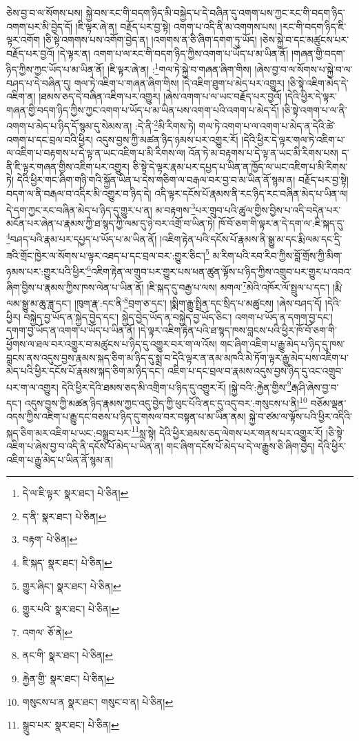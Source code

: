 ཅེས་བྱ་བ་ལ་སོགས་པས། སྐྱེ་བས་རང་གི་བདག་ཉིད་མི་བསྐྱེད་པ་དེ་བཞིན་དུ་འགག་པས་ཀྱང་རང་གི་བདག་ཉིད་འགག་པར་མི་བྱེད་དོ། །ཇི་ལྟར་ཞེ་ན། བརྗོད་པར་བྱ་སྟེ། འགག་པ་འདི་ནི་མ་འགགས་པས། །རང་གི་བདག་ཉིད་ཇི་ལྟར་འགོག །ཅི་སྟེ་འགགས་པས་འགོག་བྱེད་ན། །འགགས་ན་ཅི་ཞིག་དགག་ཏུ་ཡོད། །ཅེས་སྐྱེ་བ་དང་མཚུངས་པར་བརྗོད་པར་བྱའོ། །དེ་ལྟར་ན། འགག་པ་ལ་རང་གི་བདག་ཉིད་ཀྱིས་འགག་པ་ཡོད་པ་མ་ཡིན་ནོ། །གཞན་གྱི་བདག་ཉིད་ཀྱིས་ཀྱང་ཡོད་པ་མ་ཡིན་ནོ། །ཇི་ལྟར་ཞེ་ན། :\footnote{དེ་ལ་ཇི་ལྟར་  སྣར་ཐང་།  པེ་ཅིན། }གལ་ཏེ་སྐྱེ་བ་གཞན་ཞིག་གིས། །ཞེས་བྱ་བ་ལ་སོགས་པ་སྐྱེ་བ་ལ་བཤད་པ་དེ་བཞིན་དུ། གལ་ཏེ་འཇིག་པ་གཞན་ཞིག་གིས། །དེ་འཇིག་ཐུག་པ་མེད་པར་འགྱུར། །ཅི་སྟེ་འཇིག་མེད་དེ་འཇིག་ན། །ཐམས་ཅད་དེ་བཞིན་འཇིག་པར་འགྱུར། །ཞེས་འགག་པ་ལ་ཡང་བརྗོད་པར་བྱའོ། །དེའི་ཕྱིར་དེ་ལྟར་གཞན་གྱི་བདག་ཉིད་ཀྱིས་ཀྱང་འགག་པ་ཡོད་པ་མ་ཡིན་པས་འགག་པའི་འགག་པ་མེད་དོ། །ཅི་སྟེ་འགག་པ་ལ་ནི་འགག་པ་མེད་པ་ཉིད་དོ་སྙམ་དུ་སེམས་ན། :དེ་ནི་\footnote{ད་ནི་  སྣར་ཐང་།  པེ་ཅིན། }མི་རིགས་ཏེ། གལ་ཏེ་འགག་པ་ལ་འགག་པ་མེད་ན་དེའི་ཚེ་འགག་པ་དང་བྲལ་བའི་ཕྱིར། འདུས་བྱས་ཀྱི་མཚན་ཉིད་ཉམས་པར་འགྱུར་རོ། །དེའི་ཕྱིར་དེ་ལྟར་གལ་ཏེ་འཇིག་པ་ལ་འཇིག་པ་བརྟགས་པ་དེ་ལྟ་ན་ཡང་འཇིག་པ་མི་རིགས་ལ། འོན་ཏེ་མ་བརྟགས་པ་དེ་ལྟ་ན་ཡང་མི་རིགས་པས། ད་ནི་ཇི་ལྟར་གཞན་གྱིས་འཇིག་པར་འགྱུར། ཅི་སྟེ་དེ་ལྟར་རྣམ་པར་དཔྱད་པ་ཡིན་ན་ཁྱོད་ལ་ཡང་འཇིག་པ་མི་རིགས་ཏེ། དེའི་ཕྱིར་གང་ཞིག་གཉི་གའི་སྐྱོན་ཡིན་པ་དེས་གཅིག་ལ་བརྒལ་བར་བྱ་བ་མ་ཡིན་ནོ་སྙམ་ན། བརྗོད་པར་བྱ་སྟེ། བདག་ལ་ནི་བརྒལ་བ་འདིར་མི་འགྱུར་བ་ཉིད་དེ། འདི་ལྟར་དངོས་པོ་རྣམས་ནི་རང་ཉིད་རང་བཞིན་མེད་པ་ཡིན་ལ། དེ་དག་ཀྱང་རང་བཞིན་མེད་པ་ཉིད་དུ་གྱུར་པ་ན། མ་བརྟགས་\footnote{བརྟག་  པེ་ཅིན། }པར་གྲུབ་པའི་ཚུལ་གྱིས་བྱིས་པ་འདི་བདེན་པར་མངོན་པར་ཞེན་པ་རྣམས་ཀྱི་ཐ་སྙད་ཀྱི་ལམ་དུ་ཉེ་བར་འགྲོ་བ་ཡིན་ཏེ། ཁོ་བོ་ཅག་གི་ལྟར་ན་དེ་དག་ལ་:ཇི་སྐད་དུ་\footnote{ཇི་སྐད་  སྣར་ཐང་།  པེ་ཅིན། }བཤད་པའི་རྣམ་པར་དཔྱད་པ་ཡོད་པ་མ་ཡིན་ནོ། །འཇིག་རྟེན་པའི་དངོས་པོ་རྣམས་ནི་སྒྱུ་མ་དང་རྨི་ལམ་དང་དྲི་ཟའི་གྲོང་ཁྱེར་ལ་སོགས་པ་ལྟར་འཐད་པ་དང་བྲལ་བར་:གྱུར་ཅིང་།\footnote{གྱུར་ཞིང་།  སྣར་ཐང་།  པེ་ཅིན། } མ་རིག་པའི་རབ་རིབ་ཀྱིས་བློ་གྲོས་ཀྱི་མིག་ཉམས་པར་:གྱུར་པའི་ཕྱིར་\footnote{གྱུར་པའི་  སྣར་ཐང་།  པེ་ཅིན། }འཇིག་རྟེན་ལ་གྲུབ་པར་གྱུར་པས་ཕན་ཚུན་ལྟོས་པ་ཉིད་ཀྱིས་འགྲུབ་པར་གྱུར་པ་འབའ་ཞིག་བྱིས་པ་རྣམས་ཀྱིས་ཁས་ལེན་པ་ཡིན་ནོ། །ཇི་སྐད་དུ་བརྒྱ་པ་ལས། མགལ་\footnote{འགལ་  ཅོ་ནེ། }མེའི་འཁོར་ལོ་སྤྲུལ་པ་དང་། །རྨི་ལམ་སྒྱུ་མ་ཆུ་ཟླ་དང་། །ཁུག་རྣ་:དང་ནི་\footnote{ནང་གི་  སྣར་ཐང་།  པེ་ཅིན། }བྲག་ཅ་དང་། །སྨིག་རྒྱུ་སྤྲིན་དང་སྲིད་པ་མཚུངས། །ཞེས་བཤད་དོ། །དེའི་ཕྱིར། བསྐྱེད་བྱ་ཡོད་ན་སྐྱེད་བྱེད་དང་། སྐྱེད་བྱེད་ཡོད་ན་བསྐྱེད་བྱ་ཡོད་ཅིང་། འགག་པ་ཡོད་ན་དགག་བྱ་དང་། དགག་བྱ་ཡོད་ན་འགག་པ་ཡོད་པ་ཡིན་ནོ། །དེ་ལྟར་འཇིག་རྟེན་པའི་ཐ་སྙད་ཁས་བླངས་པའི་ཕྱིར་ཁོ་བོ་ཅག་གི་ཕྱོགས་ལ་ཐལ་བར་འགྱུར་བ་མཚུངས་པ་ཉིད་དུ་འགྱུར་བར་ག་ལ་འོས། གང་ཞིག་འཇིག་པ་རྒྱུ་མེད་པ་ཉིད་དུ་ཁས་བླངས་ནས་འདུས་བྱས་རྣམས་སྐད་ཅིག་མ་ཉིད་དུ་སྨྲ་བ་དེའི་ལྟར་ན་ནམ་མཁའི་མེ་ཏོག་ལྟར་རྒྱུ་མེད་པས་འཇིག་པ་མེད་པའི་ཕྱིར་དངོས་པོ་རྣམས་སྐད་ཅིག་མ་ཉིད་དང་། འཇིག་པ་དང་བྲལ་བ་རྣམས་འདུས་བྱས་ཉིད་དུ་འང་འགྲུབ་པར་ག་ལ་འགྱུར། དེའི་ཕྱིར་དེའི་ཐམས་ཅད་མི་འགྲིག་པ་ཉིད་དུ་འགྱུར་རོ། །སྐྱེ་བའི་:རྐྱེན་གྱིས་\footnote{རྐྱེན་གྱི་  སྣར་ཐང་།  པེ་ཅིན། }རྒ་ཤི་ཞེས་བྱ་བ་དང་། འདུས་བྱས་ཀྱི་མཚན་ཉིད་རྣམས་ཀྱང་འདུ་བྱེད་ཀྱི་ཕུང་པོའི་ནང་དུ་འདུ་བར་:གསུངས་པ་ནི།\footnote{གསུངས་པ་ན  སྣར་ཐང་། གསུང་བ་ན།  པེ་ཅིན། } བཅོམ་ལྡན་འདས་ཀྱིས་འཇིག་པ་རྒྱུ་དང་བཅས་པ་ཉིད་དུ་གསལ་བར་བསྟན་པ་མ་ཡིན་ནམ། སྐྱེ་བ་ཙམ་ལ་ལྟོས་པའི་ཕྱིར་འདིའི་སྐད་ཅིག་མར་འཇིག་པ་ཡང་:བསྒྲུབ་པར་\footnote{སྒྲུབ་པར་  སྣར་ཐང་།  པེ་ཅིན། }སླ་སྟེ། དེའི་ཕྱིར་ཐམས་ཅད་ལེགས་པར་གནས་པར་འགྱུར་རོ། །ཅི་སྟེ་འཇིག་པ་ཞེས་བྱ་བ་འདི་ནི་དངོས་པོ་མེད་པ་ཡིན་ན། གང་ཞིག་དངོས་པོ་མེད་པ་དེ་ལ་རྒྱུས་ཅི་ཞིག་བྱེད། དེའི་ཕྱིར་འཇིག་པ་རྒྱུ་མེད་པ་ཡིན་ནོ་སྙམ་ན། 